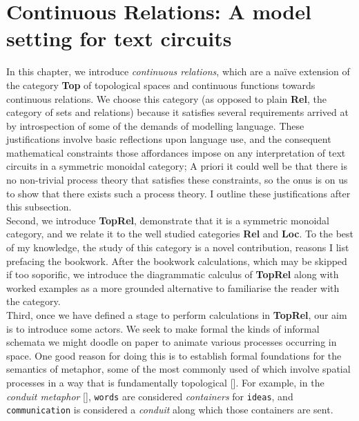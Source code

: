\section{Continuous Relations: A model setting for text circuits}

\begin{fullwidth}

In this chapter, we introduce \emph{continuous relations}, which are a na\"{i}ve extension of the category \textbf{Top} of topological spaces and continuous functions towards continuous relations. We choose this category (as opposed to plain \textbf{Rel}, the category of sets and relations) because it satisfies several requirements arrived at by introspection of some of the demands of modelling language. These justifications involve basic reflections upon language use, and the consequent mathematical constraints those affordances impose on any interpretation of text circuits in a symmetric monoidal category; A priori it could well be that there is no non-trivial process theory that satisfies these constraints, so the onus is on us to show that there exists such a process theory. I outline these justifications after this subsection.\\

Second, we introduce \textbf{TopRel}, demonstrate that it is a symmetric monoidal category, and we relate it to the well studied categories \textbf{Rel} and \textbf{Loc}. To the best of my knowledge, the study of this category is a novel contribution, reasons I list prefacing the bookwork. After the bookwork calculations, which may be skipped if too soporific, we introduce the diagrammatic calculus of \textbf{TopRel} along with worked examples as a more grounded alternative to familiarise the reader with the category.\\

Third, once we have defined a stage to perform calculations in \textbf{TopRel}, our aim is to introduce some actors. We seek to make formal the kinds of informal schemata we might doodle on paper to animate various processes occurring in space. One good reason for doing this is to establish formal foundations for the semantics of metaphor, some of the most commonly used of which involve spatial processes in a way that is fundamentally topological []. For example, in the \emph{conduit metaphor} [], \texttt{words} are considered \emph{containers} for \texttt{ideas}, and \texttt{communication} is considered a \emph{conduit} along which those containers are sent.


\end{fullwidth}
